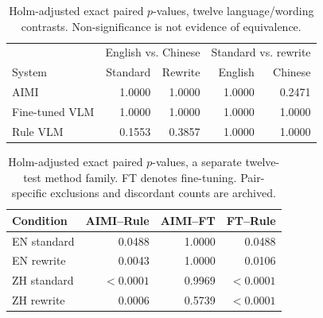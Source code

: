 \begin{table}[t]
\centering\footnotesize
\setlength{\tabcolsep}{2pt}
\begin{tabular}{@{}lrrrr@{}}
\toprule
 & \multicolumn{2}{c}{English vs. Chinese} & \multicolumn{2}{c}{Standard vs. rewrite}\\
System & Standard & Rewrite & English & Chinese\\
\midrule
AIMI & 1.0000 & 1.0000 & 1.0000 & 0.2471\\
Fine-tuned VLM & 1.0000 & 1.0000 & 1.0000 & 1.0000\\
Rule VLM & 0.1553 & 0.3857 & 1.0000 & 1.0000\\
\bottomrule
\end{tabular}
\caption{Holm-adjusted exact paired $p$-values, twelve language/wording contrasts. Non-significance is not evidence of equivalence.}
\label{tab:language-wording-tests}
\end{table}
\begin{table}[t]
\centering\footnotesize
\setlength{\tabcolsep}{3pt}
\begin{tabular}{@{}lrrr@{}}
\toprule
Condition & AIMI--Rule & AIMI--FT & FT--Rule\\
\midrule
EN standard & 0.0488 & 1.0000 & 0.0488\\
EN rewrite & 0.0043 & 1.0000 & 0.0106\\
ZH standard & $<0.0001$ & 0.9969 & $<0.0001$\\
ZH rewrite & 0.0006 & 0.5739 & $<0.0001$\\
\bottomrule
\end{tabular}
\caption{Holm-adjusted exact paired $p$-values, a separate twelve-test method family. FT denotes fine-tuning. Pair-specific exclusions and discordant counts are archived.}
\label{tab:language-method-tests}
\end{table}
